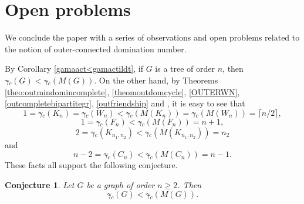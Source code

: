 \documentclass[a4paper,12pt, reqno]{amsart}
\newtheorem{Proposition}[Theorem]{Proposition}
\newtheorem{Remark}[Theorem]{Remark}
\newtheorem{Question}[Theorem]{Question}
\newtheorem{Conjecture}[Theorem]{Conjecture}
\begin{document}
\section{Open problems}
We conclude the paper with a series of observations and open problems related to the notion of outer-connected domination number.

By Corollary \ref{gamaact<gamactildt}, if $G$ is a tree of order $n$, then
$\gamma{\tilde{}} _{c}(G) <\gamma{\tilde{}} _{c}(M(G)).$ On the other hand, by Theorems \ref{theo:outmindomincomplete}, \ref{theomoutdomcycle}, \ref{OUTERWN}, \ref{outcompletebipartitegr}, \ref{outfriendship} and \cite{ocds}, it is easy to see that
\[
1=\gamma{\tilde{}} _{c}(K_n)=\gamma{\tilde{}} _{c}(W_n)<\gamma{\tilde{}} _{c}(M(K_n))=\gamma{\tilde{}} _{c}(M(W_n))=\lceil n/2\rceil,
\]
\[1=\gamma{\tilde{}} _{c}(F_n)<\gamma{\tilde{}} _{c}(M(F_n))=n+1, 
\]
\[2=\gamma{\tilde{}} _{c}(K_{n_1, n_2})<\gamma{\tilde{}} _{c}(M(K_{n_1, n_2}))=n_2 
\]
and
\[n-2=\gamma{\tilde{}} _{c}(C_n)<\gamma{\tilde{}} _{c}(M(C_n))=n-1. 
\]
These facts all support the following conjecture.
\begin{Conjecture}
Let $G$ be a graph of order $n\ge 2$. Then
$$\gamma{\tilde{}} _{c}(G) <\gamma{\tilde{}} _{c}(M(G)).$$
\end{Conjecture}


\end{document}
